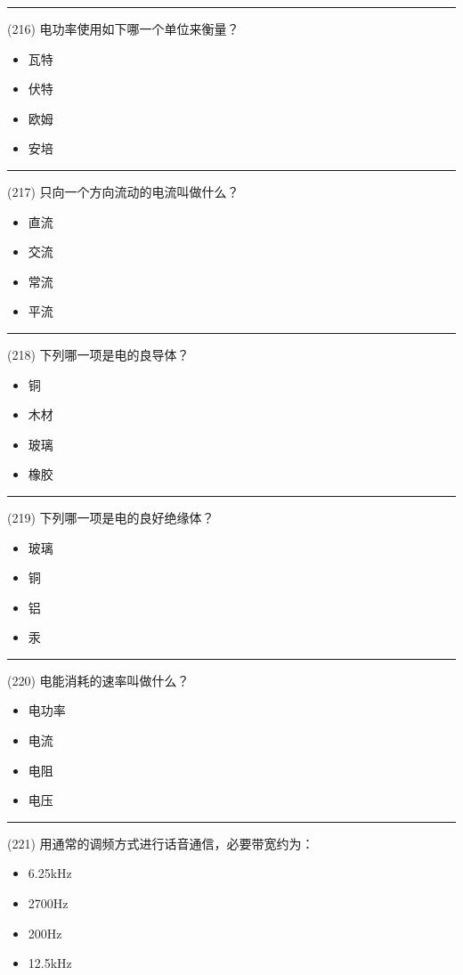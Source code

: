 \documentclass[twocolumn]{ctexart}  %
\begin{document}
\noindent\rule{0.5\textwidth}{1pt}
\heiti (216) 电功率使用如下哪一个单位来衡量？ \songti {\color{gray} [LK1135] }
\begin{itemize}
	\item  瓦特
	\item  伏特
	\item  欧姆
	\item  安培
\end{itemize}


\noindent\rule{0.5\textwidth}{1pt}
\heiti (217) 只向一个方向流动的电流叫做什么？ \songti {\color{gray} [LK1136] }
\begin{itemize}
	\item  直流
	\item  交流
	\item  常流
	\item  平流
\end{itemize}


\noindent\rule{0.5\textwidth}{1pt}
\heiti (218) 下列哪一项是电的良导体？ \songti {\color{gray} [LK1138] }
\begin{itemize}
	\item  铜
	\item  木材
	\item  玻璃
	\item  橡胶
\end{itemize}


\noindent\rule{0.5\textwidth}{1pt}
\heiti (219) 下列哪一项是电的良好绝缘体？ \songti {\color{gray} [LK1139] }
\begin{itemize}
	\item  玻璃
	\item  铜
	\item  铝
	\item  汞
\end{itemize}


\noindent\rule{0.5\textwidth}{1pt}
\heiti (220) 电能消耗的速率叫做什么？ \songti {\color{gray} [LK1140] }
\begin{itemize}
	\item  电功率
	\item  电流
	\item  电阻
	\item  电压
\end{itemize}


\noindent\rule{0.5\textwidth}{1pt}
\heiti (221) 用通常的调频方式进行话音通信，必要带宽约为： \songti {\color{gray} [LK0123] }
\begin{itemize}
	\item  6.25kHz
	\item  2700Hz
	\item  200Hz
	\item  12.5kHz
\end{itemize}
\end{document}
